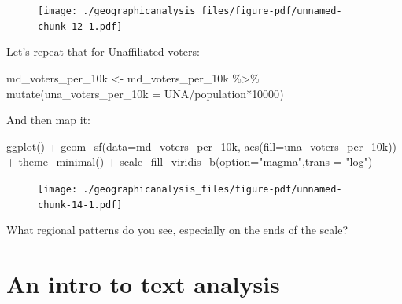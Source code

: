 \documentclass[
  letterpaper,
  DIV=11,
  numbers=noendperiod]{scrreprt}
\newenvironment{Shaded}{\begin{snugshade}}{\end{snugshade}}
\newcommand{\AttributeTok}[1]{\textcolor[rgb]{0.40,0.45,0.13}{#1}}
\newcommand{\DecValTok}[1]{\textcolor[rgb]{0.68,0.00,0.00}{#1}}
\newcommand{\FunctionTok}[1]{\textcolor[rgb]{0.28,0.35,0.67}{#1}}
\newcommand{\NormalTok}[1]{\textcolor[rgb]{0.00,0.23,0.31}{#1}}
\newcommand{\OtherTok}[1]{\textcolor[rgb]{0.00,0.23,0.31}{#1}}
\newcommand{\SpecialCharTok}[1]{\textcolor[rgb]{0.37,0.37,0.37}{#1}}
\newcommand{\StringTok}[1]{\textcolor[rgb]{0.13,0.47,0.30}{#1}}
\begin{document}
\begin{figure}[H]

{\centering \texttt{[image: ./geographicanalysis\_files/figure-pdf/unnamed-chunk-12-1.pdf]}

}

\end{figure}

Let's repeat that for Unaffiliated voters:

\begin{Shaded}
\begin{Highlighting}[]
\NormalTok{md\_voters\_per\_10k }\OtherTok{\textless{}{-}}\NormalTok{ md\_voters\_per\_10k }\SpecialCharTok{\%\textgreater{}\%} 
  \FunctionTok{mutate}\NormalTok{(}\AttributeTok{una\_voters\_per\_10k =}\NormalTok{ UNA}\SpecialCharTok{/}\NormalTok{population}\SpecialCharTok{*}\DecValTok{10000}\NormalTok{)}
\end{Highlighting}
\end{Shaded}

And then map it:

\begin{Shaded}
\begin{Highlighting}[]
\FunctionTok{ggplot}\NormalTok{() }\SpecialCharTok{+}
  \FunctionTok{geom\_sf}\NormalTok{(}\AttributeTok{data=}\NormalTok{md\_voters\_per\_10k, }\FunctionTok{aes}\NormalTok{(}\AttributeTok{fill=}\NormalTok{una\_voters\_per\_10k)) }\SpecialCharTok{+}
  \FunctionTok{theme\_minimal}\NormalTok{() }\SpecialCharTok{+}
  \FunctionTok{scale\_fill\_viridis\_b}\NormalTok{(}\AttributeTok{option=}\StringTok{"magma"}\NormalTok{,}\AttributeTok{trans =} \StringTok{"log"}\NormalTok{)}
\end{Highlighting}
\end{Shaded}

\begin{figure}[H]

{\centering \texttt{[image: ./geographicanalysis\_files/figure-pdf/unnamed-chunk-14-1.pdf]}

}

\end{figure}

What regional patterns do you see, especially on the ends of the scale?


\hypertarget{an-intro-to-text-analysis}{%
\chapter{An intro to text analysis}\label{an-intro-to-text-analysis}}
\end{document}
